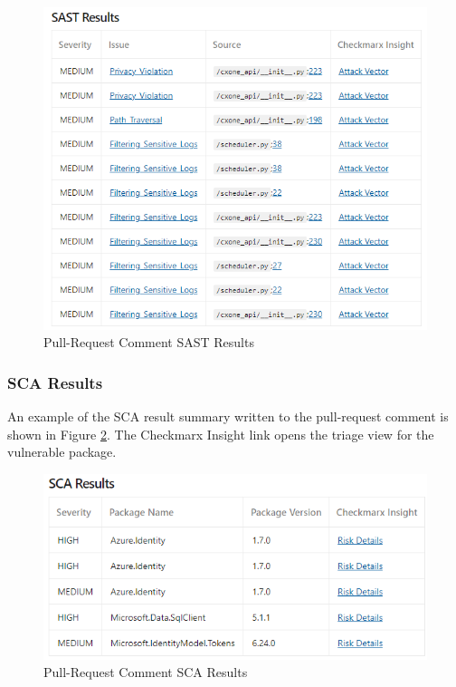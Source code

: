 \begin{figure}[h]
    \includegraphics[width=\textwidth]{graphics/pr-sast.png}
    \caption{Pull-Request Comment SAST Results}
    \label{fig:pr-sast-section}
\end{figure}

\subsubsection{SCA Results}

An example of the SCA result summary written to the pull-request comment
is shown in Figure
\ref{fig:pr-sca-section}.  The Checkmarx Insight link opens the triage view 
for the vulnerable package. 

\begin{figure}[h]
    \includegraphics[width=\textwidth]{graphics/pr-sca.png}
    \caption{Pull-Request Comment SCA Results}
    \label{fig:pr-sca-section}
\end{figure}


